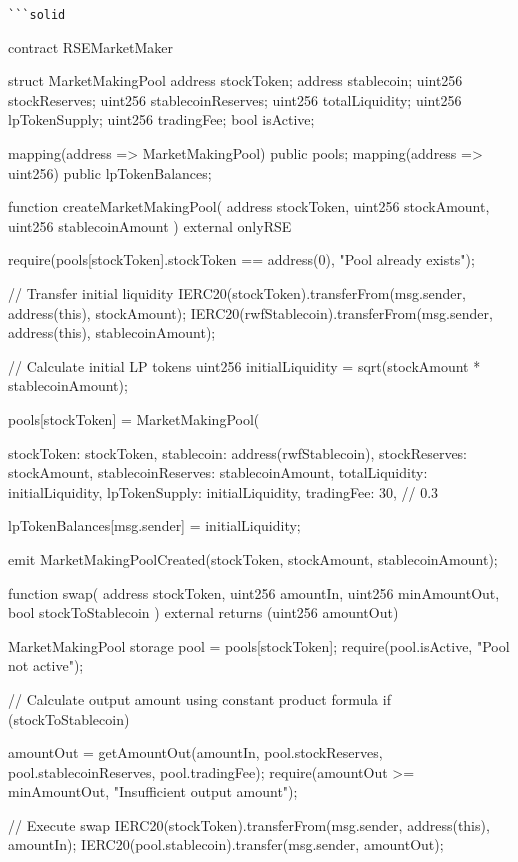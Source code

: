 \documentclass[12pt]{article}
\begin{document}
\begin{lstlisting}
```solid
\end{lstlisting}
contract RSEMarketMaker {    struct MarketMakingPool {        address stockToken;        address stablecoin;        uint256 stockReserves;        uint256 stablecoinReserves;        uint256 totalLiquidity;        uint256 lpTokenSupply;        uint256 tradingFee;        bool isActive;    }

    mapping(address => MarketMakingPool) public pools;    mapping(address => uint256) public lpTokenBalances;

    function createMarketMakingPool(        address stockToken,        uint256 stockAmount,        uint256 stablecoinAmount    ) external onlyRSE {        require(pools[stockToken].stockToken == address(0), "Pool already exists");

        // Transfer initial liquidity        IERC20(stockToken).transferFrom(msg.sender, address(this), stockAmount);        IERC20(rwfStablecoin).transferFrom(msg.sender, address(this), stablecoinAmount);

        // Calculate initial LP tokens        uint256 initialLiquidity = sqrt(stockAmount * stablecoinAmount);

        pools[stockToken] = MarketMakingPool({            stockToken: stockToken,            stablecoin: address(rwfStablecoin),            stockReserves: stockAmount,            stablecoinReserves: stablecoinAmount,            totalLiquidity: initialLiquidity,            lpTokenSupply: initialLiquidity,            tradingFee: 30, // 0.3%

        lpTokenBalances[msg.sender] = initialLiquidity;

        emit MarketMakingPoolCreated(stockToken, stockAmount, stablecoinAmount);    }

    function swap(        address stockToken,        uint256 amountIn,        uint256 minAmountOut,        bool stockToStablecoin    ) external returns (uint256 amountOut) {        MarketMakingPool storage pool = pools[stockToken];        require(pool.isActive, "Pool not active");

        // Calculate output amount using constant product formula        if (stockToStablecoin) {            amountOut = getAmountOut(amountIn, pool.stockReserves, pool.stablecoinReserves, pool.tradingFee);            require(amountOut >= minAmountOut, "Insufficient output amount");

            // Execute swap            IERC20(stockToken).transferFrom(msg.sender, address(this), amountIn);            IERC20(pool.stablecoin).transfer(msg.sender, amountOut);

}}}}
\end{document}
